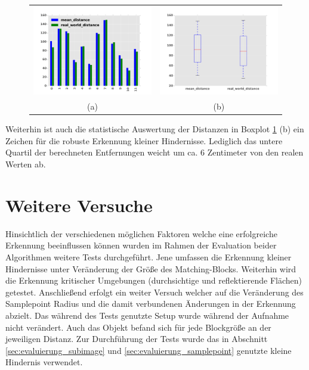 \begin{figure}[h]
	\centering
	\begin{tabular}{cc}
	\includegraphics[width=7cm]{img/evaluation/diagrams/sample_tiny_bar}&
	\includegraphics[width=7cm]{img/evaluation/diagrams/sample_tiny_box}\\
	 (a) & (b)
	\end{tabular}
	\caption{}
    \label{fig:sample_eval_tiny}
\end{figure}

\noindent
Weiterhin ist auch die statistische Auswertung der Distanzen in Boxplot \ref{fig:sample_eval_tiny} (b) ein Zeichen für die robuste Erkennung kleiner Hindernisse. Lediglich das untere Quartil der berechneten Entfernungen weicht um ca. 6 Zentimeter von den realen Werten ab.

\section{Weitere Versuche}
\label{sec:further_tests}

Hinsichtlich der verschiedenen möglichen Faktoren welche eine erfolgreiche Erkennung beeinflussen können wurden im Rahmen der Evaluation beider Algorithmen weitere Tests durchgeführt. Jene umfassen die Erkennung kleiner Hindernisse unter Veränderung der Größe des Matching-Blocks. Weiterhin wird die Erkennung kritischer Umgebungen (durchsichtige und  reflektierende Flächen) getestet. Anschließend erfolgt ein weiter Versuch welcher auf die Veränderung des Samplepoint Radius und die damit verbundenen Änderungen in der Erkennung abzielt. Das während des Tests genutzte Setup wurde während der Aufnahme nicht verändert. Auch das Objekt befand sich für jede Blockgröße an der jeweiligen Distanz. Zur Durchführung der Tests wurde das in Abschnitt \ref{sec:evaluierung_subimage} und \ref{sec:evaluierung_samplepoint} genutzte kleine Hindernis verwendet.

